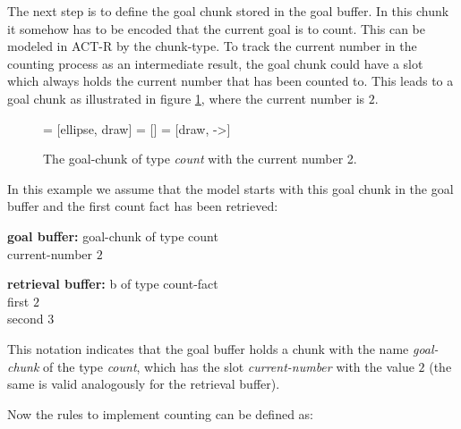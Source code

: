The next step is to define the goal chunk stored in the goal buffer. In this chunk it somehow has to be encoded that the current goal is to count. This can be modeled in ACT-R by the chunk-type. To track the current number in the counting process as an intermediate result, the goal chunk could have a slot which always holds the current number that has been counted to. This leads to a goal chunk as illustrated in figure \ref{fig:example_counting_goal_chunk}, where the current number is $2$.

\begin{figure}[hbt]
\centering
{} = [ellipse, draw]
 = [] 
 = [draw, ->]   

\caption{The goal-chunk of type \emph{count} with the current number 2.}
\label{fig:example_counting_goal_chunk}
\end{figure}


In this example we assume that the model starts with this goal chunk in the goal buffer and the first count fact has been retrieved:

\parbox{100mm}{\textbf{goal buffer:} goal-chunk of type count\\
\noindent\hspace*{20mm} current-number $2$}

\parbox{100mm}{\textbf{retrieval buffer:} b of type count-fact\\
\noindent\hspace*{20mm} first $2$\\
\noindent\hspace*{20mm} second $3$}

This notation indicates that the goal buffer holds a chunk with the name \emph{goal-chunk} of the type \emph{count}, which has the slot \emph{current-number} with the value $2$ (the same is valid analogously for the retrieval buffer).

Now the rules to implement counting can be defined as:

\begin{center}
\end{center}

